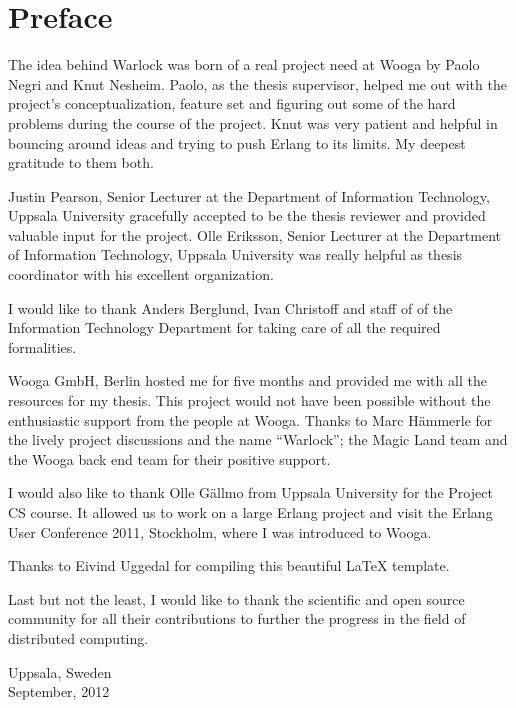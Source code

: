 \chapter{Preface}

The idea behind Warlock was born of a real project need at Wooga by Paolo Negri
and Knut Nesheim. Paolo, as the thesis supervisor, helped me out with the
project's conceptualization, feature set and figuring out some of the hard 
problems during the course of the project. Knut was very patient and helpful
in bouncing around ideas and trying to push Erlang to its limits. My deepest
gratitude to them both.

Justin Pearson, Senior Lecturer at the Department of Information Technology,
Uppsala University gracefully accepted to be the thesis reviewer and provided
valuable input for the project. Olle Eriksson, Senior Lecturer at the Department
of Information Technology, Uppsala University was really helpful as thesis
coordinator with his excellent organization.

I would like to thank Anders Berglund, Ivan Christoff and staff of 
of the Information Technology Department for taking care of all the required 
formalities.

Wooga GmbH, Berlin hosted me for five months and provided me with all the 
resources for my thesis. This project would not have 
been possible without the enthusiastic support from the people 
at Wooga. Thanks to Marc Hämmerle for the lively project discussions and the
name ``Warlock''; the Magic Land team and the Wooga back end team for their
positive support.

I would also like to thank Olle Gällmo from Uppsala University for the
Project CS course. It allowed us to work on a large Erlang project and
visit the Erlang User Conference 2011, Stockholm, where I was
introduced to Wooga.

Thanks to Eivind Uggedal for compiling this beautiful {\LaTeX} template.

Last but not the least, I would like to thank the scientific and open
source community for all their contributions to further the progress in the
field of distributed computing.\\


\raggedright{Uppsala, Sweden \\
September, 2012}

